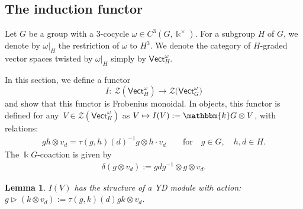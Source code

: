 \documentclass[pdftex]{sigma}
\numberwithin{equation}{section}
\newtheorem{Lemma}[Theorem]{Lemma}
\newcommand{\Vect}{\mathsf{Vect}}
\newcommand{\cZ}{\mathcal{Z}}
\newcommand{\rI}{I}
\begin{document}
\subsection{The induction functor}\label{sec:I}
Let $G$ be a group with a $3$-cocycle $\omega\in C^3(G,\Bbbk^\times)$. For a subgroup $H$ of $G$, we denote by $\omega|_H$ the restriction of $\omega$ to $H^3$. We denote the category of $H$-graded vector spaces twisted by $\omega|_H$ simply by $\Vect_H^\omega$.

In this section, we define a functor
\[\rI \colon\ \cZ( \Vect_H^\omega) \to \cZ\big(\Vect_G^\omega\big)\]
and show that this functor is Frobenius monoidal.
In objects, this functor is defined for any~$V \in \cZ( \Vect_H^\omega)$ as $V \mapsto \rI (V):=\mathbbm{k}G \otimes V$, with relations:
\begin{align}\label{eq:relationsIV}
gh \otimes v_d =\tau(g,h)(d)^{-1} g \otimes h \cdot v_d \qquad \text{for}\quad g \in G, \quad h,d \in H.
\end{align}
The $\Bbbk G$-coaction is given by
\begin{gather*}
\delta ( g \otimes v_d ) := gdg^{-1} \otimes g \otimes v_d.
\end{gather*}

\begin{Lemma}\label{lem:IV-twistedYD}
$\rI ( V )$ has the structure of a YD module with action: ${g\! \vartriangleright\! ( k \otimes v_d ):=\tau(g,k)(d) gk\! \otimes\! v_d}$.
\end{Lemma}
\end{document}
